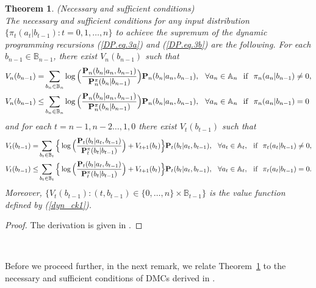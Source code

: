 \documentclass[11pt, a4paper, journal,onecolumn]{IEEEtran}
\newcommand{\mb}{\mathbb}
\newcommand{\hso}{\hspace{.1in}}
\newtheorem{theorem}{Theorem}[section]
\begin{document}
\begin{theorem}(Necessary and sufficient conditions)\label{nessufco}{\ \\}
 The necessary and sufficient conditions for any input distribution $\{\pi_t(a_t|b_{t-1}):t=0,1,\ldots,n\}$ to achieve the supremum of the dynamic programming recursions (\ref{DP.eq.3a}) and (\ref{DP.eq.3b})  are the following. For each $b_{n-1}\in {\mb B}_{n-1}$, there exist $V_n(b_{n-1})$ such that 
\begin{align}
 V_n(b_{n-1}) =& \sum_{b_{n}\in {\mb B}_n}\log\Big(\frac{{\bf P}_n(b_n|a_n,b_{n-1})}{{\bf P}^{\pi}_{n}(b_n|b_{n-1})}\Big){\bf P}_n(b_n|a_n,b_{n-1}), \hso   \forall{a_n}\in{\mb A}_n \hso \mbox{if} \hso \pi_n(a_n|b_{n-1})\neq{0},  \label{suff_equa_ter_con}\\
V_n(b_{n-1}) \leq & \sum_{b_{n}\in {\mb B}_n}\log\Big(\frac{{\bf P}_n(b_n|a_n,b_{n-1})}{{\bf P}^{\pi}_{n}(b_n|b_{n-1})}\Big){\bf P}_n(b_n|a_n,b_{n-1}), \hso   \forall{a_n}\in{\mb A}_n \hso \mbox{if} \hso \pi_n(a_n|b_{n-1})={0}  \label{suff_equa_ter_con_a}
\end{align}
and for each $t=n-1,n-2\ldots,1,0$ there exist  $V_t(b_{t-1})$ such that    
\begin{align}
 V_t(b_{t-1}) = & \sum_{b_{t}\in {\mb B}_t}\Big\{\log\Big(\frac{{\bf P}_t(b_t|a_t,b_{t-1})}{{\bf P}_t^{\pi}(b_t|b_{t-1})}\Big)+V_{t+1}(b_{t})\Big\}{\bf P}_t(b_t|a_t,b_{t-1}), \hso \forall {a_t}\in{\mb A}_t, \hso \mbox{if} \hso \pi_t(a_t|b_{t-1})\neq{0}, \label{suff_equa}\\
 V_t(b_{t-1}) \leq & \sum_{b_{t}\in {\mb B}_t}\Big\{\log\Big(\frac{{\bf P}_t(b_t|a_t,b_{t-1})}{{\bf P}_t^{\pi}(b_t|b_{t-1})}\Big)+V_{t+1}(b_{t})\Big\}{\bf P}_t(b_t|a_t,b_{t-1}), \hso \forall {a_t}\in{\mb A}_t, \hso \mbox{if} \hso  \pi_t(a_t|b_{t-1})={0}. \label{suff_equa_a}
\end{align}
 Moreover, $\{V_t(b_{t-1}): (t, b_{t-1})\in \{0, \ldots, n\}\times {\mb B}_{t-1}\}$ is the value function  defined by (\ref{dyn_ck1}).
\end{theorem}
\begin{proof} The derivation is given in \cite{stavrou2016sequential}.
\end{proof}

\ \

Before we proceed further, in the next remark, we  relate Theorem~\ref{nessufco} to the necessary and sufficient conditions of DMCs derived in \cite{gallager}.\\ 
\end{document}
